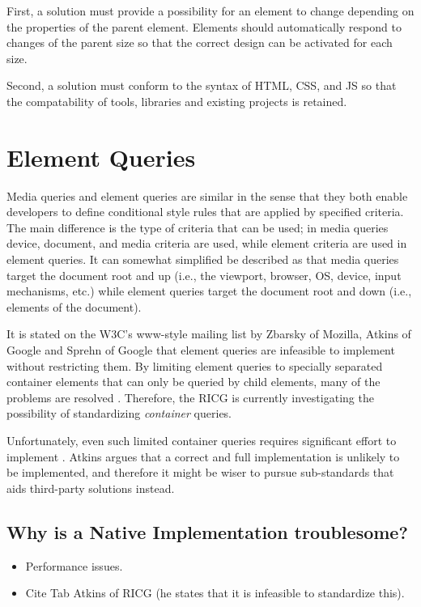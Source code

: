 \documentclass{acm_proc_article-sp}
\begin{document}
      First, a solution must provide a possibility for an element to change depending on the properties of the parent element.
      Elements should automatically respond to changes of the parent size so that the correct design can be activated for each size.

      Second, a solution must conform to the syntax of HTML, CSS, and JS so that the compatability of tools, libraries and existing projects is retained.

\section{Element Queries}
  Media queries and element queries are similar in the sense that they both enable developers to define conditional style rules that are applied by specified criteria.
  The main difference is the type of criteria that can be used; in media queries device, document, and media criteria are used, while element criteria are used in element queries.
  It can somewhat simplified be described as that media queries target the document root and up (i.e., the viewport, browser, OS, device, input mechanisms, etc.) while element queries target the document root and down (i.e., elements of the document).

  It is stated on the W3C's www-style mailing list \cite{w3c_eq_mail} by Zbarsky of Mozilla, Atkins of Google and Sprehn of Google that element queries are infeasible to implement without restricting them.
  By limiting element queries to specially separated container elements that can only be queried by child elements, many of the problems are resolved \cite{ricg_irc_log,ricg_issue_viewport}.
  Therefore, the RICG is currently investigating the possibility of standardizing \emph{container} queries.

  Unfortunately, even such limited container queries requires significant effort to implement \cite{ricg_issue_viewport}.
  Atkins argues that a correct and full implementation is unlikely to be implemented, and therefore it might be wiser to pursue sub-standards that aids third-party solutions instead.
  

  \subsection{Why is a Native Implementation troublesome?}
    \begin{itemize}
      \item Performance issues.
      \item Cite Tab Atkins of RICG (he states that it is infeasible to standardize this).
    \end{itemize}
\end{document}
